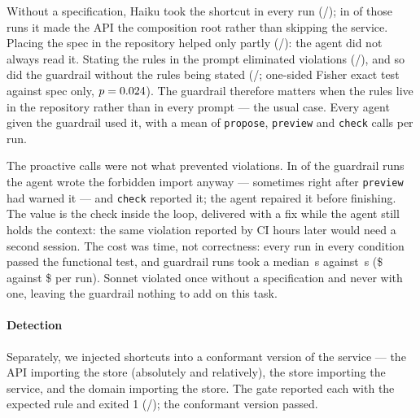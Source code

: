 \documentclass[10pt,conference]{IEEEtran}
\newcommand{\tool}[1]{\texttt{#1}}
\begin{document}
\begin{table}[t]
  \centering
  \caption{Agent runs violating the specification (errors only) and passing
  the functional test, by condition.}
  \label{tab:eval}
  \footnotesize
  \EvalTable
\end{table}

Without a specification, Haiku took the shortcut in every run
(\HaikuOffViol{}/\HaikuOffN{}); in \HaikuOffCompRoot{} of those runs it made the
API the composition root rather than skipping the service. Placing the spec in the
repository helped only partly (\HaikuSpecViol{}/\HaikuSpecN{}): the agent did
not always read it. Stating the rules in the prompt eliminated violations
(\HaikuAdvisoryViol{}/\HaikuAdvisoryN{}), and so did the guardrail without the
rules being stated (\HaikuToolsViol{}/\HaikuToolsN{}; one-sided Fisher exact
test against spec only, $p=0.024{}$). The guardrail therefore matters
when the rules live in the repository rather than in every prompt --- the
usual case. Every agent given the guardrail used it, with a mean of \HaikuToolsProposeAvg{} \tool{propose},
\HaikuToolsPreviewAvg{} \tool{preview} and \HaikuToolsCheckAvg{} \tool{check}
calls per run.

The proactive calls were not what prevented violations. In
\HaikuToolsRepaired{} of the \HaikuToolsN{} guardrail runs the agent wrote the
forbidden import anyway --- sometimes right after \tool{preview} had warned
it --- and \tool{check} reported it; the agent repaired it before finishing. The
value is the check inside the loop, delivered with a fix while the agent still
holds the context: the same violation reported by CI hours later would need a
second session. The cost was time, not correctness: every run in every
condition passed the functional test, and guardrail runs took a median
\HaikuToolsWall{}\,s against \HaikuSpecWall{}\,s (\$\HaikuToolsCost{} against
\$\HaikuSpecCost{} per run). Sonnet violated once without a specification and
never with one, leaving the guardrail nothing to add on this task.

\paragraph*{Detection}
Separately, we injected \InjectN{} shortcuts into a conformant version of the
service --- the API importing the store (absolutely and relatively), the store
importing the service, and the domain importing the store. The gate reported
each with the expected rule and exited 1 (\InjectCaught{}/\InjectN{}); the
conformant version passed.
\end{document}
